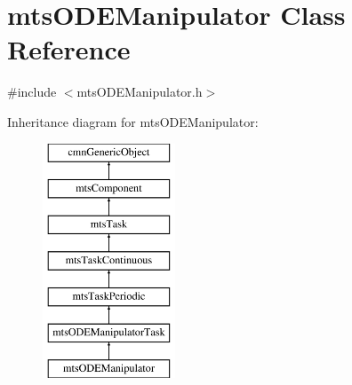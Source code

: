 \hypertarget{classmts_o_d_e_manipulator}{}\section{mts\+O\+D\+E\+Manipulator Class Reference}
\label{classmts_o_d_e_manipulator}


{\ttfamily \#include $<$mts\+O\+D\+E\+Manipulator.\+h$>$}

Inheritance diagram for mts\+O\+D\+E\+Manipulator\+:\begin{figure}[H]
\begin{center}
\leavevmode
\includegraphics[height=7.000000cm]{de/d46/classmts_o_d_e_manipulator}
\end{center}
\end{figure}
